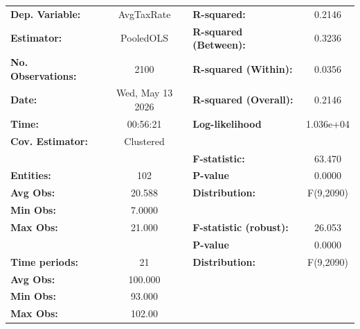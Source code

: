 \begin{center}
\begin{tabular}{lclc}
\toprule
\textbf{Dep. Variable:}                       &     AvgTaxRate     & \textbf{  R-squared:         }   &      0.2146      \\
\textbf{Estimator:}                           &     PooledOLS      & \textbf{  R-squared (Between):}  &      0.3236      \\
\textbf{No. Observations:}                    &        2100        & \textbf{  R-squared (Within):}   &      0.0356      \\
\textbf{Date:}                                &  Wed, May 13 2026  & \textbf{  R-squared (Overall):}  &      0.2146      \\
\textbf{Time:}                                &      00:56:21      & \textbf{  Log-likelihood     }   &    1.036e+04     \\
\textbf{Cov. Estimator:}                      &     Clustered      & \textbf{                     }   &                  \\
\textbf{}                                     &                    & \textbf{  F-statistic:       }   &      63.470      \\
\textbf{Entities:}                            &        102         & \textbf{  P-value            }   &      0.0000      \\
\textbf{Avg Obs:}                             &       20.588       & \textbf{  Distribution:      }   &    F(9,2090)     \\
\textbf{Min Obs:}                             &       7.0000       & \textbf{                     }   &                  \\
\textbf{Max Obs:}                             &       21.000       & \textbf{  F-statistic (robust):} &      26.053      \\
\textbf{}                                     &                    & \textbf{  P-value            }   &      0.0000      \\
\textbf{Time periods:}                        &         21         & \textbf{  Distribution:      }   &    F(9,2090)     \\
\textbf{Avg Obs:}                             &      100.000       & \textbf{                     }   &                  \\
\textbf{Min Obs:}                             &       93.000       & \textbf{                     }   &                  \\
\textbf{Max Obs:}                             &       102.00       & \textbf{                     }   &                  \\

\end{tabular}
\end{center}
